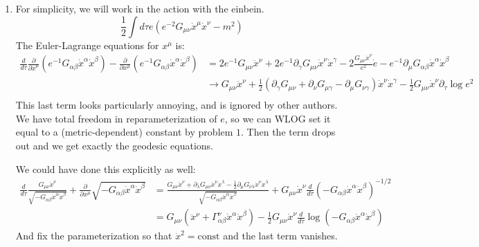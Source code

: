 \documentclass[11pt, class=article, crop=false]{standalone}
\begin{document}
\begin{enumerate}
		\item For simplicity, we will work in the action with the einbein.
		\[
			\frac12 \int d\tau e (e^{-2} G_{\mu \nu} \dot x^\mu \dot x^\nu - m^2) %
		\]
		The Euler-Lagrange equations for $x^\mu$ is:
		\begin{equation}
			\begin{aligned}
				\frac{d}{d\tau} \frac{\partial}{\partial \dot x^\mu} (e^{-1} G_{\alpha \beta} \dot x^\alpha \dot x^\beta) - \frac{\partial}{\partial x^\mu}\left( e^{-1} G_{\alpha \beta} \dot x^\alpha \dot x^\beta \right)
				&= 2 e^{-1} G_{\mu \nu} \ddot x^\nu + 2 e^{-1} \partial_\gamma G_{\mu \nu} \dot x^\nu \dot x^\gamma - 2 \frac{G_{\mu \nu} \dot x^\nu}{e^2} \dot e  - e^{-1} \partial_\mu G_{\alpha \beta} \dot x^\alpha \dot x^\beta\\
				&\to G_{\mu \nu} \ddot x^\nu + \frac12 (\partial_\gamma G_{\mu \nu} + \partial_\nu G_{\mu \gamma} - \partial_\mu G_{\nu \gamma}) \dot x^\nu \dot x^\gamma - \frac12 G_{\mu \nu} \dot x^\nu \partial_\tau \log e^2 \\
			\end{aligned}
		\end{equation}
		This last term looks particularly annoying, and is ignored by other authors. We have total freedom in reparameterization of $e$, so we can WLOG set it equal to a (metric-dependent) constant by problem $1$. Then the term drops out and we get exactly the geodesic equations. 

		We could have done this explicitly as well: 
		\begin{equation}
			\begin{aligned}
				\frac{d}{d\tau} \frac{G_{\mu \nu} \dot x^\nu}{\sqrt{-G_{\alpha \beta} \dot x^\alpha \dot x^\beta}} + \frac{\partial}{\partial x^\mu} \sqrt{-G_{\alpha \beta} \dot x^\alpha \dot x^\beta} &= \frac{G_{\mu \nu} \ddot x^\nu + \partial_\lambda G_{\mu \nu} \dot x^\nu \dot x^\lambda - \frac12 \partial_\mu G_{\nu \lambda} \dot x^\nu \dot x^\lambda}{ \sqrt{-G_{\alpha \beta} \dot x^\alpha \dot x^\beta}} + G_{\mu \nu} \dot x^\nu \frac{d}{d\tau} (-G_{\alpha \beta} \dot x^\alpha \dot x^\beta)^{-1/2}\\
				&= G_{\mu \nu} (\ddot x^\nu + \Gamma^\nu_{\alpha \beta} \dot x^\alpha \dot x^\beta) - \frac12 G_{\mu \nu} \dot x^\nu \frac{d}{d\tau} \log(-G_{\alpha \beta} \dot x^\alpha \dot x^\beta)
			\end{aligned}
		\end{equation}
		And fix the parameterization so that $\dot x^2 = \mathrm{const}$ and the last term vanishes.
		

\end{enumerate}
\end{document}
